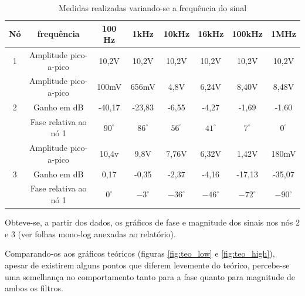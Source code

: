 \documentclass[a4paper]{article} %
\begin{document}
%
\begin{table}[h]
\begin{centering}
\caption{Medidas realizadas variando-se a frequência do sinal \label{tab:var-freq}}
\begin{tabular}{|c|c|c|c|c|c|c|c|}
\hline 
Nó & frequência & 100 Hz & 1kHz & 10kHz & 16kHz & 100kHz & 1MHz\tabularnewline
\hline
\hline 
1 & Amplitude pico-a-pico & 10,2V & 10,2V  & 10,2V & 10,2V & 10,2V  &10,2V \tabularnewline
\hline 
\multirow{3}{*}{2}
 & Amplitude pico-a-pico & 100mV & 656mV & 4,8V & 6,24V & 8,40V & 8,48V \tabularnewline
\cline{2-8} 
 & \multicolumn{1}{c|}{Ganho em dB} & -40,17 & -23,83  & -6,55 & -4,27  & -1,69  & -1,60 \tabularnewline
\cline{2-8} 

 & Fase relativa ao nó 1 & $90^{\circ}$ & $86^{\circ}$  & $56^{\circ}$  & $41^{\circ}$  & $7^{\circ}$  & $0^{\circ}$ \tabularnewline
\hline 
\multirow{3}{*}{3}
 & Amplitude pico-a-pico & 10,4v & 9,8V & 7,76V & 6,32V  & 1,42V  & 180mV \tabularnewline
\cline{2-8} 
 
 & Ganho em dB &  0,17 & -0,35  & -2,37 & -4,16 & -17,13 & -35,07\tabularnewline
\cline{2-8} 
 
 & Fase relativa ao nó 1 & $0^{\circ}$ & $-3^{\circ}$ & $-36^{\circ}$  & $-46^{\circ}$  & $-72^{\circ}$  & $-90^{\circ}$ \tabularnewline
\hline
\end{tabular}
\par\end{centering}

\end{table}

\newpage
Obteve-se, a partir dos dados, os gráficos de fase e magnitude dos sinais nos nós 2 e 3 (ver folhas mono-log anexadas ao relatório).

Comparando-os aos gráficos teóricos (figuras \ref{fig:teo_low} e \ref{fig:teo_high}), apesar de existirem alguns pontos que diferem levemente do teórico, percebe-se uma semelhança no comportamento tanto para a fase quanto para magnitude de ambos os filtros.   
\end{document}
